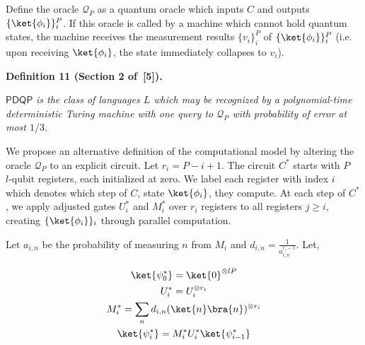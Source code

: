 Define the oracle $\mathcal{Q}_{P}$ as a quantum oracle which inputs $C$ and outputs $\{\ket{\phi_{i}}\}_{i}^{P}$. If this oracle is called by a machine which cannot hold quantum states, the machine receives the measurement results $\{v_{i}\}_{i}^{P}$ of $\{\ket{\phi_{i}}\}_{i}^{P}$ (i.e. upon receiving $\ket{\phi_{i}}$, the state immediately collapses to $v_{i}$).\par





\par\medskip\noindent\textbf{
\textbf{Definition 11}\textbf{ }(Section 2 of [5])\textbf{.}
}\par



$\mathsf{PDQP}$\emph{ is the class of languages $L$ which may be recognized by a polynomial-time deterministic Turing machine with one query to $\mathcal{Q}_{P}$ with probability of error at most $1/3$.}\par






We propose an alternative definition of the computational model by altering the oracle $\mathcal{Q}_{P}$ to an explicit circuit. Let $r_{i}=P-i+1$. The circuit $C^{*}$ starts with $P$ $l\text{-qubit}$ registers, each initialized at zero. We label each register with index $i$ which denotes which step of $C$, state $\ket{\phi_{i}}$, they compute. At each step of $C^{*}$, we apply adjusted gates $U^{*}_{i}$ and $M^{*}_{i}$ over $r_{i}$ registers to all registers $j\geq i$, creating $\{\ket{\phi_{i}}\}_{i}$ through parallel computation.\par




Let $a_{i,n}$ be the probability of measuring $n$ from $M_{i}$ and $d_{i,n}=\frac{1}{a_{i,n}^{r_{i}-1}}$. Let,\par


\[\begin{gathered}
\displaystyle\ket{\psi_{0}^{*}} \displaystyle=\ket{0}^{\otimes lP} \\
\displaystyle U_{i}^{*} \displaystyle=U_{i}^{\otimes r_{i}} \\
\displaystyle M_{i}^{*} \displaystyle=\sum_{n}d_{i,n}(\ket{n}\bra{n})^{\otimes r_{i}} \\
\displaystyle\ket{\psi_{i}^{*}} \displaystyle=M_{i}^{*}U_{i}^{*}\ket{\psi_{i-1}^{*}}
\end{gathered}\]




